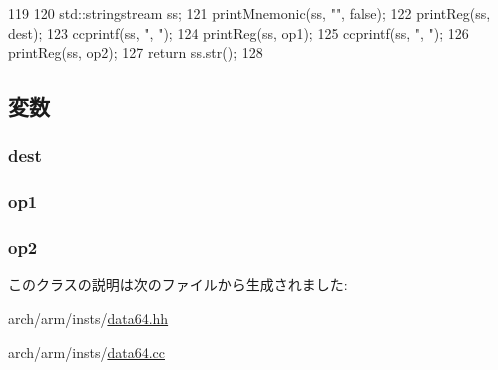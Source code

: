 \begin{DoxyCode}
119 {
120     std::stringstream ss;
121     printMnemonic(ss, "", false);
122     printReg(ss, dest);
123     ccprintf(ss, ", ");
124     printReg(ss, op1);
125     ccprintf(ss, ", ");
126     printReg(ss, op2);
127     return ss.str();
128 }
\end{DoxyCode}


\subsection{変数}
\hypertarget{classArmISA_1_1DataX2RegOp_aec72e8e45bdc87abeeeb75d2a8a9a716}{
\subsubsection[{dest}]{ {\bf dest}}}
\label{classArmISA_1_1DataX2RegOp_aec72e8e45bdc87abeeeb75d2a8a9a716}
\hypertarget{classArmISA_1_1DataX2RegOp_a4c465c43ad568f8bcf8ae71480e9cfea}{
\subsubsection[{op1}]{ {\bf op1}}}
\label{classArmISA_1_1DataX2RegOp_a4c465c43ad568f8bcf8ae71480e9cfea}
\hypertarget{classArmISA_1_1DataX2RegOp_a7799ff6cbe5a252199059eb8665820e7}{
\subsubsection[{op2}]{ {\bf op2}}}
\label{classArmISA_1_1DataX2RegOp_a7799ff6cbe5a252199059eb8665820e7}


このクラスの説明は次のファイルから生成されました:\begin{DoxyCompactItemize}
\item 
arch/arm/insts/\hyperlink{data64_8hh}{data64.hh}\item 
arch/arm/insts/\hyperlink{data64_8cc}{data64.cc}\end{DoxyCompactItemize}
